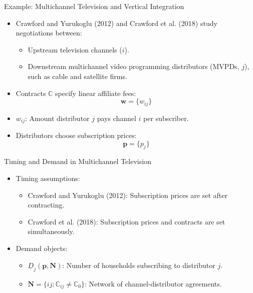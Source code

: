 \documentclass[aspectratio=169]{beamer}  %
\begin{document}
\begin{frame}{Example: Multichannel Television and Vertical Integration}
    \begin{itemize}
        \item Crawford and Yurukoglu (2012) and Crawford et al. (2018) study negotiations between:
        \begin{itemize}
            \item Upstream television channels (\(i\)).
            \item Downstream multichannel video programming distributors (MVPDs, \(j\)), such as cable and satellite firms.
        \end{itemize}
        \item Contracts \(\mathbb{C}\) specify linear affiliate fees:
        \[
        \boldsymbol{w} = \{w_{ij}\}
        \]
        \item \(w_{ij}\): Amount distributor \(j\) pays channel \(i\) per subscriber.
        \item Distributors choose subscription prices:
        \[
        \boldsymbol{p} = \{p_j\}
        \]
    \end{itemize}
\end{frame}

\begin{frame}{Timing and Demand in Multichannel Television}
    \begin{itemize}
        \item Timing assumptions:
        \begin{itemize}
            \item Crawford and Yurukoglu (2012): Subscription prices are set after contracting.
            \item Crawford et al. (2018): Subscription prices and contracts are set simultaneously.
        \end{itemize}
        \item Demand objects:
        \begin{itemize}
            \item \(\underline{D}_j(\boldsymbol{p}, \boldsymbol{N})\): Number of households subscribing to distributor \(j\).
            \item \(\boldsymbol{N} = \{ij : \mathbb{C}_{ij} \neq \mathbb{C}_0\}\): Network of channel-distributor agreements.
        \end{itemize}
    \end{itemize}
\end{frame}
\end{document}
